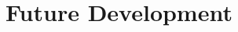 \documentclass[a4paper,12pt,oneside,onecolumn,final,fleqn]{config/repUERJ}
\begin{document}
\chapter*{Future Development}%
\label{ch:future}%




\backmatter%

\end{document}
